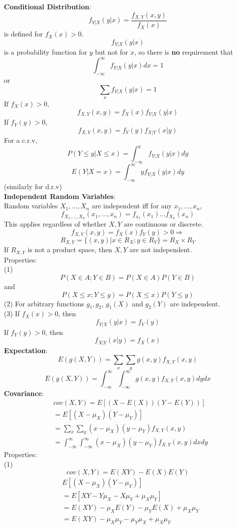 \documentclass{article}
\begin{document}
\begin{multicols*}{3}
\textbf{Conditional Distribution}: \\
$$f_{Y|X}(y|x)=\frac{f_{X,Y}(x,y)}{f_X(x)}$$ is defined for $f_X(x)>0$.
$$f_{Y|X}(y|x)$$ is a probability function for $y$ but not for $x$, so there is \textbf{no} requirement that $$\int^\infty_{-\infty}f_{Y|X}(y|x)dx=1$$ or $$\sum_x f_{Y|X}(y|x)=1$$
If $f_X(x)>0$, $$f_{X,Y}(x,y)=f_X(x)f_{Y|X}(y|x)$$
If $f_Y(y)>0$, $$f_{X,Y}(x,y)=f_Y(y)f_{X|Y}(x|y)$$
For a c.r.v, $$P(Y\leq y|X\leq x)=\int^y_{-\infty}f_{Y|X}(y|x)dy$$ 
$$E(Y|X=x)=\int^\infty_{-\infty}yf_{Y|X}(y|x)dy$$ 
(similarly for d.r.v)\\
\textbf{Independent Random Variables}: \\
Random variables $X_1,\dots,X_n$ are independent iff for any $x_1,\dots,x_n$, $$f_{X_1,\dots,X_n}(x_1,\dots,x_n)=f_{x_1}(x_1)\dots f_{X_n}(x_n)$$ 
This applies regardless of whether $X,Y$ are continuous or discrete. \\
$$f_{X,Y}(x,y)=f_X(x)f_Y(y)>0 \Rightarrow$$ 
$$ R_{X,Y}=\{(x,y)|x\in R_X; y\in R_Y\}=R_X\times R_Y$$
If $R_{X,Y}$ is not a product space, then $X, Y$ are not independent.\\
Properties:\\
(1) $$P(X\in A;Y\in B)=P(X\in A)P(Y\in B)$$ and $$P(X\leq x;Y\leq y)=P(X\leq x)P(Y\leq y)$$
(2) For arbitrary functions $g_1, g_2$, $g_1(X)$ and $g_2(Y)$ are independent.\\
(3) If $f_X(x)>0$, then $$f_{Y|X}(y|x)=f_Y(y)$$
If $f_Y(y)>0$, then $$f_{X|Y}(x|y)=f_X(x)$$
\textbf{Expectation}:\\
$$E(g(X,Y))=\sum_x\sum_y g(x,y)f_{X,Y}(x,y)$$
$$E(g(X,Y))=\int^\infty_{-\infty}\int^\infty_{-\infty}g(x,y)f_{X,Y}(x,y)dydx$$
\textbf{Covariance}:
\begin{align*}
&cov(X,Y) = E[(X-E(X))(Y-E(Y))]\\
&=E[(X-\mu_X)(Y-\mu_Y)] \\
&=\sum_x\sum_y(x-\mu_X)(y-\mu_Y)f_{X,Y}(x,y) \\
&=\int^\infty_{-\infty}\int^\infty_{-\infty}(x-\mu_X)(y-\mu_Y)f_{X,Y}(x,y)dxdy
\end{align*}
Properties:\\
(1) $$cov(X,Y) = E(XY)-E(X)E(Y)$$
\begin{align*}
&E[(X-\mu_X)(Y-\mu_Y)]\\
&=E[XY-Y\mu_X-X\mu_Y+\mu_X\mu_Y]\\
&=E(XY)-\mu_XE(Y)-\mu_YE(X)+\mu_X\mu_Y\\
&=E(XY)-\mu_X\mu_Y-\mu_Y\mu_X+\mu_X\mu_Y\\

\end{align*}
\end{multicols*}
\end{document}
